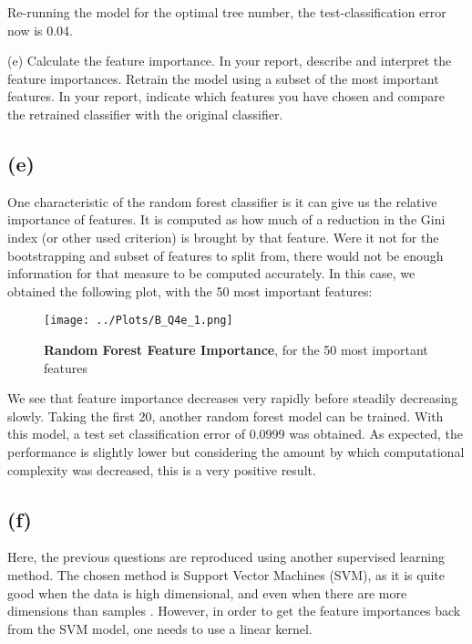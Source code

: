 \documentclass[12pt]{report} %
\begin{document}
Re-running the model for the optimal tree number, the test-classification error now is 0.04.


(e) Calculate the feature importance. In your report, describe and interpret the feature importances. Retrain the model using a subset of the most important features. In your report, indicate which features you have chosen and compare the retrained classifier with the original classifier.


\subsection*{(e)}

One characteristic of the random forest classifier is it can give us the relative importance of features. It is computed as how much of a reduction in the Gini index (or other used criterion) is brought by that feature. Were it not for the bootstrapping and subset of features to split from, there would not be enough information for that measure to be computed accurately\cite[pp. 345-346]{james2013introduction}. In this case, we obtained the following plot, with the 50 most important features:

\begin{figure}[htbp]
    \centering
    \texttt{[image: ../Plots/B\_Q4e\_1.png]}
    \caption{\textbf{Random Forest Feature Importance}, for the 50 most important features}
\end{figure}

We see that feature importance decreases very rapidly before steadily decreasing slowly. Taking the first 20, another random forest model can be trained. With this model, a test set classification error of 0.0999 was obtained. As expected, the performance is slightly lower but considering the amount by which computational complexity was decreased, this is a very positive result.


\subsection*{(f)}

Here, the previous questions are reproduced using another supervised learning method. The chosen method is Support Vector Machines (SVM), as it is quite good when the data is high dimensional, and even when there are more dimensions than samples \cite{svm_sklearn}. However, in order to get the feature importances back from the SVM model, one needs to use a linear kernel. 
\end{document}
